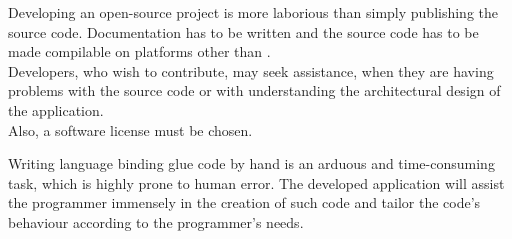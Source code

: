 Developing an open-source project is more laborious than simply publishing the source code. Documentation has to be written and the source code has to be made compilable on platforms other than .\\
Developers, who wish to contribute, may seek assistance, when they are having problems with the source code or with understanding the architectural design of the application.\\
Also, a software license must be chosen.

Writing language binding glue code by hand is an arduous and time-consuming task, which is highly prone to human error. The developed application will assist the \linebreak programmer immensely in the creation of such code and tailor the code's behaviour according to the programmer's needs.